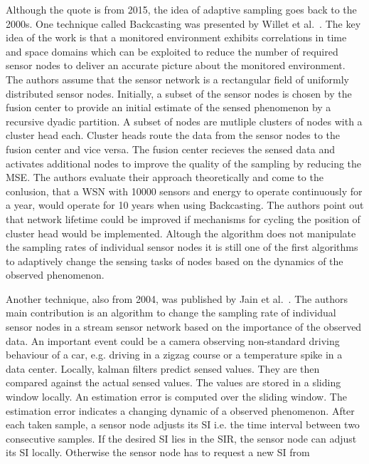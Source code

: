 \par
Although the quote is from 2015, the idea of adaptive sampling goes back to the
2000s. One technique called Backcasting was presented by Willet et
al.~\cite{willett2004backcasting}. The key idea of the work is that a monitored
environment exhibits correlations in time and space domains which can be
exploited to reduce the number of required sensor nodes to deliver an accurate
picture about the monitored environment. The authors assume that the sensor
network is a rectangular field of uniformly distributed sensor nodes.
Initially, a subset of the sensor nodes is chosen by the fusion center to
provide an initial estimate of the sensed phenomenon by a recursive dyadic
partition. A subset of nodes are mutliple clusters of nodes with a cluster head
each. Cluster heads route the data from the sensor nodes to the fusion center
and vice versa. The fusion center recieves the sensed data and activates
additional nodes to improve the quality of the sampling by reducing the
\ac{MSE}. The authors evaluate their approach theoretically and come to the
conlusion, that a \ac{WSN} with 10000 sensors and energy to operate
continuously for a year, would operate for 10 years when using Backcasting. The
authors point out that network lifetime could be improved if mechanisms for
cycling the position of cluster head would be implemented. Altough the
algorithm does not manipulate the sampling rates of individual sensor nodes it
is still one of the first algorithms to adaptively change the sensing tasks of
nodes based on the dynamics of the observed phenomenon.
\par
Another technique, also from 2004, was published by Jain et
al.~\cite{jain2004adaptive}. The authors main contribution is an algorithm to
change the sampling rate of individual sensor nodes in a stream sensor network
based on the importance of the observed data. An important event could be a
camera observing non-standard driving behaviour of a car, e.g. driving in a
zigzag course or a temperature spike in a data center. Locally, kalman filters
predict sensed values. They are then compared against the actual sensed values.
The values are stored in a sliding window locally. An estimation error is
computed over the sliding window. The estimation error indicates a changing
dynamic of a observed phenomenon. After each taken sample, a sensor node
adjusts its \ac{SI} i.e. the time interval between two consecutive samples. If
the desired \ac{SI} lies in the \ac{SIR}, the sensor node can adjust its
\ac{SI} locally. Otherwise the sensor node has to request a new \ac{SI} from
